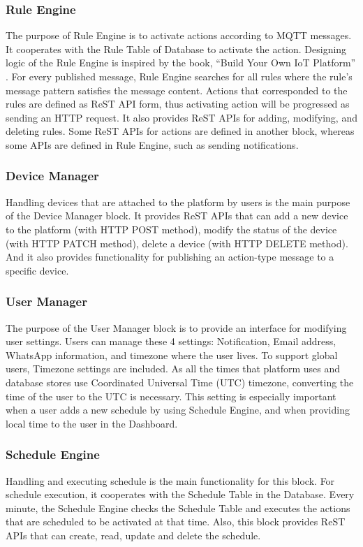 \documentclass[conference]{IEEEtran}
\begin{document}
\subsubsection{Rule Engine}
\hfill \break The purpose of Rule Engine is to activate actions according to MQTT messages. It cooperates with the Rule Table of Database to activate the action. Designing logic of the Rule Engine is inspired by the book, “Build Your Own IoT Platform” \cite{b25}. For every published message, Rule Engine searches for all rules where the rule's message pattern satisfies the message content. Actions that corresponded to the rules are defined as ReST API form, thus activating action will be progressed as sending an HTTP request. It also provides ReST APIs for adding, modifying, and deleting rules. Some ReST APIs for actions are defined in another block, whereas some APIs are defined in Rule Engine, such as sending notifications.

\subsubsection{Device Manager}
\hfill \break Handling devices that are attached to the platform by users is the main purpose of the Device Manager block. It provides ReST APIs that can add a new device to the platform (with HTTP POST method), modify the status of the device (with HTTP PATCH method), delete a device (with HTTP DELETE method). And it also provides functionality for publishing an action-type message to a specific device.

\subsubsection{User Manager}
\hfill \break The purpose of the User Manager block is to provide an interface for modifying user settings. Users can manage these 4 settings: Notification, Email address, WhatsApp information, and timezone where the user lives.  To support global users, Timezone settings are included. As all the times that platform uses and database stores use Coordinated Universal Time (UTC) timezone, converting the time of the user to the UTC is necessary. This setting is especially important when a user adds a new schedule by using Schedule Engine, and when providing local time to the user in the Dashboard.

\subsubsection{Schedule Engine}
\hfill \break Handling and executing schedule is the main functionality for this block. For schedule execution, it cooperates with the Schedule Table in the Database. Every minute, the Schedule Engine checks the Schedule Table and executes the actions that are scheduled to be activated at that time. Also, this block provides ReST APIs that can create, read, update and delete the schedule.
\end{document}
